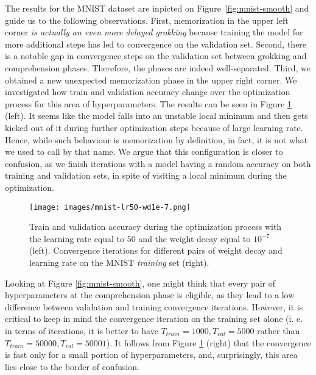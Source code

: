The results for the MNIST dataset are inpicted on Figure~\ref{fig:mnist-smooth} and guide us to the following observations. First, memorization in the upper left corner \emph{is actually an even more delayed grokking} because training the model for more additional steps has led to convergence on the validation set. Second, there is a notable gap in convergence steps on the validation set between grokking and comprehension phases. Therefore, the phases are indeed well-separated. Third, we obtained a new unexpected memorization phase in the upper right corner. We investigated how train and validation accuracy change over the optimization process for this area of hyperparameters. The results can be seen in Figure \ref{fig:mnist-strange-memorization} (left). It seems like the model falls into an unstable local minimum and then gets kicked out of it during further optimization steps because of large learning rate. Hence, while such behaviour is memorization by definition, in fact, it is not what we used to call by that name. We argue that this configuration is closer to confusion, as we finish iterations with a model having a random accuracy on both training and validation sets, in spite of visiting a local minimum during the optimization.

\begin{figure}[h]
\caption{Train and validation accuracy during the optimization process with the learning rate equal to $50$ and the weight decay equal to $10^{-7}$ (left). Convergence iterations for different pairs of weight decay and learning rate on the MNIST \emph{training} set (right).}
\centering
{\texttt{[image: images/mnist-lr50-wd1e-7.png]}}
\label{fig:mnist-strange-memorization}
\end{figure}

Looking at Figure \ref{fig:mnist-smooth}, one might think that every pair of hyperparameters at the comprehension phase is eligible, as they lead to a low difference between validation and training convergence iterations. However, it is critical to keep in mind the convergence iteration on the training set alone (i. e. in terms of iterations, it is better to have $T_{train}=1000, T_{val}=5000$ rather than $T_{train}=50000, T_{val}=50001$). It follows from Figure \ref{fig:mnist-strange-memorization} (right) that the convergence is fast only for a small portion of hyperparameters, and, surprisingly, this area lies close to the border of confusion.

